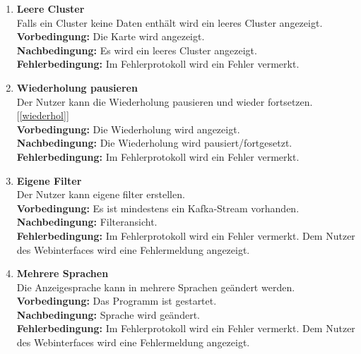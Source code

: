 \begin{enumerate}[label=\textbf{WF\arabic{enumi}0}]
	\item \textbf{Leere Cluster}\\
		Falls ein Cluster keine Daten enthält wird ein leeres Cluster angezeigt.\\
		\textbf{Vorbedingung:} Die Karte wird angezeigt.\\
		\textbf{Nachbedingung:} Es wird ein leeres Cluster angezeigt.\\
		\textbf{Fehlerbedingung:} Im Fehlerprotokoll wird ein Fehler vermerkt.
		
	\item \textbf{Wiederholung pausieren}\\
		Der Nutzer kann die Wiederholung pausieren und wieder fortsetzen. [\ref{wiederhol}]\\
		\textbf{Vorbedingung:} Die Wiederholung wird angezeigt.\\
		\textbf{Nachbedingung:} Die Wiederholung wird pausiert/fortgesetzt.\\
		\textbf{Fehlerbedingung:} Im Fehlerprotokoll wird ein Fehler vermerkt.
	
	\item \textbf{Eigene Filter}\\
		Der Nutzer kann eigene \gls{filter} erstellen.\\
		\textbf{Vorbedingung:} Es ist mindestens ein Kafka-Stream vorhanden.\\
		\textbf{Nachbedingung:} Filteransicht.\\
		\textbf{Fehlerbedingung:} Im Fehlerprotokoll wird ein Fehler vermerkt. Dem Nutzer des Webinterfaces wird eine Fehlermeldung angezeigt.
		
	\item \textbf{Mehrere Sprachen}\\
		Die Anzeigesprache kann in mehrere Sprachen geändert werden.\\
		\textbf{Vorbedingung:} Das Programm ist gestartet.\\
		\textbf{Nachbedingung:} Sprache wird geändert.\\
		\textbf{Fehlerbedingung:} Im Fehlerprotokoll wird ein Fehler vermerkt. Dem Nutzer des Webinterfaces wird eine 		Fehlermeldung angezeigt.

\end{enumerate}
